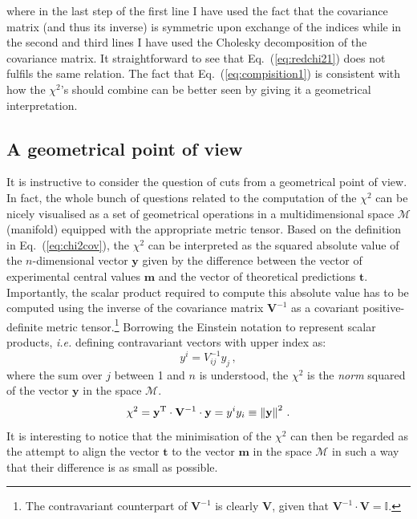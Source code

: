 \documentclass[10pt,a4paper]{article}
\begin{document}
where in the last step of the first line I have used the fact that the
covariance matrix (and thus its inverse) is symmetric upon exchange of
the indices while in the second and third lines I have used the
Cholesky decomposition of the covariance matrix. It straightforward to
see that Eq.~(\ref{eq:redchi21}) does not fulfils the same
relation. The fact that Eq.~(\ref{eq:compisition1}) is consistent with
how the $\chi^2$'s should combine can be better seen by giving it a
geometrical interpretation.

\subsection{A geometrical point of view}

It is instructive to consider the question of cuts from a geometrical
point of view. In fact, the whole bunch of questions related to the
computation of the $\chi^2$ can be nicely visualised as a set of
geometrical operations in a multidimensional space $\mathcal{M}$
(manifold) equipped with the appropriate metric tensor. Based on the
definition in Eq.~(\ref{eq:chi2cov}), the $\chi^2$ can be interpreted
as the squared absolute value of the $n$-dimensional vector
$\mathbf{y}$ given by the difference between the vector of
experimental central values $\mathbf{m}$ and the vector of theoretical
predictions $\mathbf{t}$. Importantly, the scalar product required to
compute this absolute value has to be computed using the inverse of
the covariance matrix $\mathbf{V}^{-1}$ as a covariant
positive-definite metric tensor.\footnote{The contravariant
  counterpart of $\mathbf{V}^{-1}$ is clearly $\mathbf{V}$, given that
  $\mathbf{V}^{-1}\cdot\mathbf{V}=\mathbb{I}$.} Borrowing the Einstein
notation to represent scalar products, \textit{i.e.} defining
contravariant vectors with upper index as:
\begin{equation}
y^i = V^{-1}_{ij}y_j\,,
\end{equation}
where the sum over $j$ between 1 and $n$ is understood, the $\chi^2$ is
the \textit{norm} squared of the vector $\mathbf{y}$ in the space
$\mathcal{M}$.
\begin{equation}
  \chi^2 = \mathbf{y}^{\rm T}\cdot \mathbf{V}^{-1}\cdot \mathbf{y} =
  y^iy_i\equiv \left\|\mathbf{y}\right\|^2\,.
\end{equation}
It is interesting to notice that the minimisation of the $\chi^2$ can
then be regarded as the attempt to align the vector $\mathbf{t}$ to
the vector $\mathbf{m}$ in the space $\mathcal{M}$ in such a way that
their difference is as small as possible.
\end{document}
